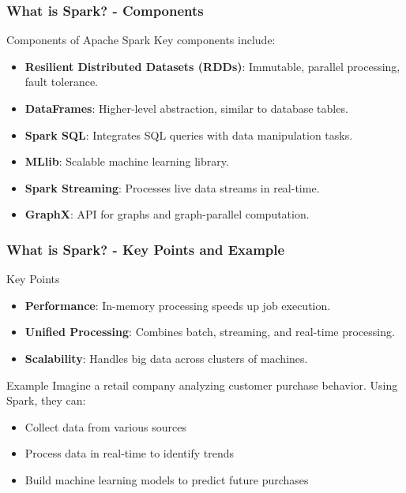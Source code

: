 \documentclass[aspectratio=169]{beamer}
\begin{document}
\begin{frame}[fragile]
    \frametitle{What is Spark? - Components}
    \begin{block}{Components of Apache Spark}
        Key components include:
        \begin{itemize}
            \item \textbf{Resilient Distributed Datasets (RDDs)}: Immutable, parallel processing, fault tolerance.
            \item \textbf{DataFrames}: Higher-level abstraction, similar to database tables.
            \item \textbf{Spark SQL}: Integrates SQL queries with data manipulation tasks.
            \item \textbf{MLlib}: Scalable machine learning library.
            \item \textbf{Spark Streaming}: Processes live data streams in real-time.
            \item \textbf{GraphX}: API for graphs and graph-parallel computation.
        \end{itemize}
    \end{block}
\end{frame}

\begin{frame}[fragile]
    \frametitle{What is Spark? - Key Points and Example}
    \begin{block}{Key Points}
        \begin{itemize}
            \item \textbf{Performance}: In-memory processing speeds up job execution.
            \item \textbf{Unified Processing}: Combines batch, streaming, and real-time processing.
            \item \textbf{Scalability}: Handles big data across clusters of machines.
        \end{itemize}
    \end{block}

    \begin{block}{Example}
        Imagine a retail company analyzing customer purchase behavior. Using Spark, they can:
        \begin{itemize}
            \item Collect data from various sources
            \item Process data in real-time to identify trends
            \item Build machine learning models to predict future purchases
        \end{itemize}
    \end{block}
\end{frame}
\end{document}

